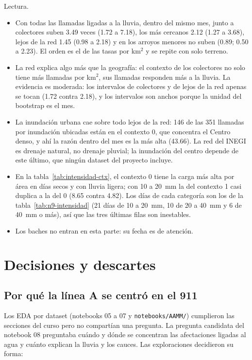 \documentclass[11pt]{article}
\newcommand{\cod}[1]{\nolinkurl{#1}}
\begin{document}
Lectura.
\begin{itemize}
  \item Con todas las llamadas ligadas a la lluvia, dentro del mismo mes, junto a colectores suben 3.49 veces (1.72 a 7.18), los más cercanos 2.12 (1.27 a 3.68), lejos de la red 1.45 (0.98 a 2.18) y en los arroyos menores no suben (0.89; 0.50 a 2.23). El orden es el de las tasas por km$^2$ y se repite con solo terreno.
  \item La red explica algo más que la geografía: el contexto de los colectores no solo tiene más llamadas por km$^2$, sus llamadas responden más a la lluvia. La evidencia es moderada: los intervalos de colectores y de lejos de la red apenas se tocan (1.72 contra 2.18), y los intervalos son anchos porque la unidad del bootstrap es el mes.
  \item La inundación urbana cae sobre todo lejos de la red: 146 de las 351 llamadas por inundación ubicadas están en el contexto 0, que concentra el Centro denso, y ahí la razón dentro del mes es la más alta (43.66). La red del INEGI es drenaje natural, no drenaje pluvial; la inundación del centro depende de este último, que ningún dataset del proyecto incluye.
  \item En la tabla~\ref{tab:intensidad-ctx}, el contexto 0 tiene la carga más alta por área en días secos y con lluvia ligera; con 10 a 20~mm la del contexto 1 casi duplica a la del 0 (8.65 contra 4.82). Los días de cada categoría son los de la tabla~\ref{tab:n9-intensidad} (21 días de 10 a 20~mm, 10 de 20 a 40~mm y 6 de 40~mm o más), así que las tres últimas filas son inestables.
  \item Los baches no entran en esta parte: su fecha es de atención.
\end{itemize}

\section{Decisiones y descartes}
\label{sec:decisiones}

\subsection{Por qué la línea A se centró en el 911}

Los EDA por dataset (notebooks 05 a 07 y \cod{notebooks/AAMM/}) cumplieron las secciones del curso pero no compartían una pregunta. La pregunta candidata del notebook 08 preguntaba cuándo y dónde se concentran las afectaciones ligadas al agua y cuánto explican la lluvia y los cauces. Las exploraciones decidieron su forma:
\end{document}
